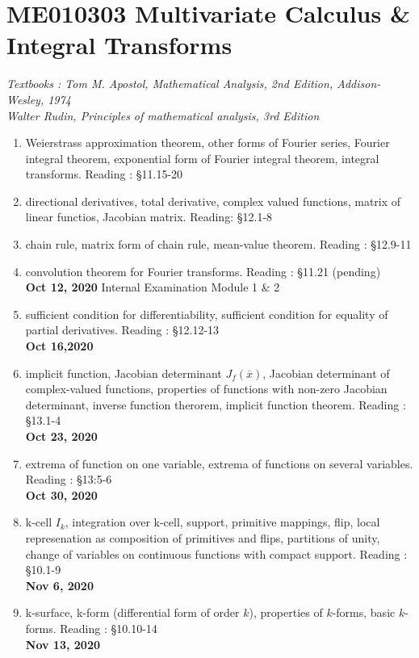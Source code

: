 \chapter{ME010303 Multivariate Calculus \& Integral Transforms}
\textit{Textbooks : Tom M. Apostol, Mathematical Analysis, 2nd Edition, Addison-Wesley, 1974\\Walter Rudin, Principles of mathematical analysis, 3rd Edition}
\begin{enumerate}[label=Week \arabic*]
	\item Weierstrass approximation theorem, other forms of Fourier series, Fourier integral theorem, exponential form of Fourier integral theorem, integral transforms. Reading : \S 11.15-20
	\item directional derivatives, total derivative, complex valued functions, matrix of linear functios, Jacobian matrix. Reading: \S 12.1-8
	\item chain rule, matrix form of chain rule, mean-value theorem. Reading : \S 12.9-11
	\item convolution theorem for Fourier transforms. Reading : \S 11.21 (pending)\\
		\textbf{Oct 12, 2020} Internal Examination Module 1 \& 2
	\item sufficient condition for differentiability, sufficient condition for equality of partial derivatives. Reading : \S 12.12-13\\
		\textbf{Oct 16,2020}
	\item implicit function, Jacobian determinant $J_f(\overline{x})$, Jacobian determinant of complex-valued functions, properties of functions with non-zero Jacobian determinant, inverse function therorem, implicit function theorem. Reading : \S 13.1-4\\
		\textbf{Oct 23, 2020}
	\item extrema of function on one variable, extrema of functions on several variables. Reading : \S 13:5-6\\
		\textbf{Oct 30, 2020}
	\item k-cell $I_k$, integration over k-cell, support, primitive mappings, flip, local represenation as composition of primitives and flips, partitions of unity, change of variables on continuous functions with compact support.  Reading : \S 10.1-9\\
		\textbf{Nov 6, 2020}
	\item k-surface, k-form (differential form of order $k$), properties of $k$-forms, basic $k$-forms. Reading : \S 10.10-14\\
		\textbf{Nov 13, 2020}
\end{enumerate}
